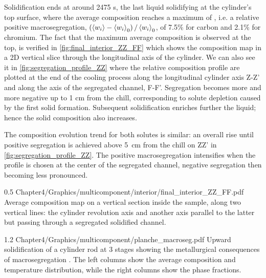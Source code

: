 Solidification ends at around \num{2475} s, the last liquid solidifying at the cylinder’s top surface, where the average composition 
reaches a maximum of , i.e. a relative positive macrosegregation, 
$\left( \left \langle w_i \right \rangle-\left \langle w_i \right \rangle_0 \right)/\left \langle w_i \right \rangle_0$, of 7.5\% for carbon and 2.1\% for chromium. The fact that the maximum average 
composition is observed at the top, is verified in \cref{fig:final_interior_ZZ_FF} which shows the composition map in a 2D 
vertical slice through the longitudinal axis of the cylinder. We can also see it in \cref{fig:segregation_profile_ZZ} where the 
relative composition profile are plotted at the end of the cooling process along the longitudinal cylinder 
axis Z-Z’ and along the axis of the segregated channel, F-F’. 
Segregation becomes more and more negative up to 1 cm from the chill, corresponding 
to solute depletion caused by the first solid formation. Subsequent solidification enriches further the 
liquid; hence the solid composition also increases. 

The composition evolution trend for both solutes is similar: 
an overall rise until positive segregation is achieved above \SI{5}{\centi\metre} from the 
chill on ZZ' in \cref{fig:segregation_profile_ZZ}. 
The positive macrosegregation intensifies when the profile is chosen at the center of 
the segregated channel, negative segregation then becoming less pronounced.

\begin{figureth}
{0.5}
{Chapter4/Graphics/multicomponent/interior/final_interior_ZZ_FF.pdf}
{Average composition map on a vertical section inside the sample, along two vertical lines: the cylinder revolution axis
and another axis parallel to the latter but passing through a segregated solidified channel.}
\label{fig:final_interior_ZZ_FF}
\end{figureth}

\begin{landscape}
\begin{figureth}
{1.2}
{Chapter4/Graphics/multicomponent/planche_macroseg.pdf}
{Upward solidification of a cylinder rod  at 3 stages showing the metallurgical consequences 
of macrosegregation . The left columns show the average 
composition and temperature distribution, while the right columns show the phase fractions.}
\label{fig:planche_withmacroseg}
\end{figureth}
\end{landscape}

